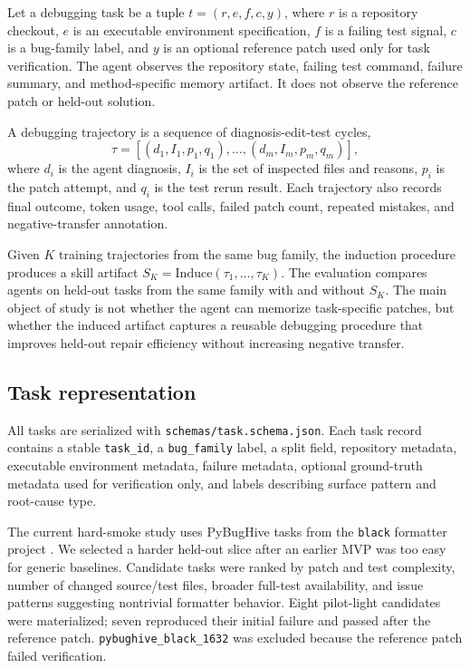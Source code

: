 Let a debugging task be a tuple $t=(r,e,f,c,y)$, where $r$ is a repository checkout, $e$ is an executable environment specification, $f$ is a failing test signal, $c$ is a bug-family label, and $y$ is an optional reference patch used only for task verification. The agent observes the repository state, failing test command, failure summary, and method-specific memory artifact. It does not observe the reference patch or held-out solution.

A debugging trajectory is a sequence of diagnosis-edit-test cycles,
\[
\tau = [(d_1,I_1,p_1,q_1),\ldots,(d_m,I_m,p_m,q_m)],
\]
where $d_i$ is the agent diagnosis, $I_i$ is the set of inspected files and reasons, $p_i$ is the patch attempt, and $q_i$ is the test rerun result. Each trajectory also records final outcome, token usage, tool calls, failed patch count, repeated mistakes, and negative-transfer annotation.

Given $K$ training trajectories from the same bug family, the induction procedure produces a skill artifact $S_K = \mathrm{Induce}(\tau_1,\ldots,\tau_K)$. The evaluation compares agents on held-out tasks from the same family with and without $S_K$. The main object of study is not whether the agent can memorize task-specific patches, but whether the induced artifact captures a reusable debugging procedure that improves held-out repair efficiency without increasing negative transfer.

\subsection{Task representation}
\label{sec:method_tasks}

All tasks are serialized with \texttt{schemas/task.schema.json}. Each task record contains a stable \texttt{task\_id}, a \texttt{bug\_family} label, a split field, repository metadata, executable environment metadata, failure metadata, optional ground-truth metadata used for verification only, and labels describing surface pattern and root-cause type.

The current hard-smoke study uses PyBugHive tasks from the \texttt{black} formatter project \cite{antal2024pybughive}. We selected a harder held-out slice after an earlier MVP was too easy for generic baselines. Candidate tasks were ranked by patch and test complexity, number of changed source/test files, broader full-test availability, and issue patterns suggesting nontrivial formatter behavior. Eight pilot-light candidates were materialized; seven reproduced their initial failure and passed after the reference patch. \texttt{pybughive\_black\_1632} was excluded because the reference patch failed verification.

